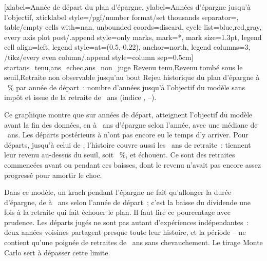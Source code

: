 [xlabel={Ann\'ee de d\'epart du plan d'\'epargne},
  ylabel={Ann\'ees d'\'epargne jusqu'\`a l'objectif},
  xticklabel style={/pgf/number format/set thousands separator={}},
  table/empty cells with={nan}, unbounded coords=discard,
  cycle list={{blue},{red},{gray}}, every axis plot post/.append style={only marks, mark=*,
    mark size=1.3pt},
  legend cell align=left, legend style={at={(0.5,-0.22)}, anchor=north, legend columns=3,
    /tikz/every even column/.append style={column sep=0.5cm}}]%
  {start}{ans_tenu,ans_echec,ans_non_juge}%
  {{Revenu tenu},{Revenu tomb\'e sous le seuil},{Retraite non observable jusqu'au bout}}%
  {Rejeu historique du plan d'\'epargne \`a \ReferenzSparquote~\% par ann\'ee de d\'epart~: nombre
  d'ann\'ees jusqu'\`a l'objectif du mod\`ele sans imp\^ot et issue de la retraite de \McRenteAns~ans
  (indice \IndiceActionsUs, \ShillerDebut--\ShillerFin).\label{fig:rejeu-annee-depart}}

Ce graphique montre que sur \RueckspielDebuts{} ann\'ees de d\'epart, \RueckspielAtteints{}
atteignent l'objectif du mod\`ele avant la fin des donn\'ees, en \RueckspielAnsMin{} \`a
\RueckspielAnsMax~ans d'\'epargne selon l'ann\'ee, avec une m\'ediane de \RueckspielAnsMedian~ans. Les
d\'eparts post\'erieurs \`a \RueckspielDernierAtteint{} n'ont pas encore eu le temps d'y arriver. Pour
\RueckspielJuges{} d\'eparts, jusqu'\`a celui de \RueckspielDernierJuge, l'histoire couvre aussi les
\McRenteAns~ans de retraite~: \RueckspielTenus{} tiennent leur revenu au-dessus du seuil, soit
\RueckspielTenusProzent~\%, et \RueckspielEchecs{} \'echouent.  Ce sont des retraites commenc\'ees avant ou pendant ces
baisses, dont le revenu n'avait pas encore assez progress\'e pour amortir le choc.

Dans ce mod\`ele, un krach pendant l'\'epargne ne fait qu'allonger la dur\'ee d'\'epargne, de
\RueckspielAnsMin{} \`a \RueckspielAnsMax~ans selon l'ann\'ee de d\'epart~; c'est la baisse du dividende
une fois \`a la retraite qui fait \'echouer le plan. Il faut lire ce pourcentage avec prudence. Les
\RueckspielJuges{} d\'eparts jug\'es ne sont pas autant d'exp\'eriences ind\'ependantes~: deux ann\'ees
voisines partagent presque toute leur histoire, et la p\'eriode \ShillerDebut--\ShillerFin{} ne
contient qu'une poign\'ee de retraites de \McRenteAns~ans sans chevauchement. Le tirage Monte Carlo
sert \`a d\'epasser cette limite.

